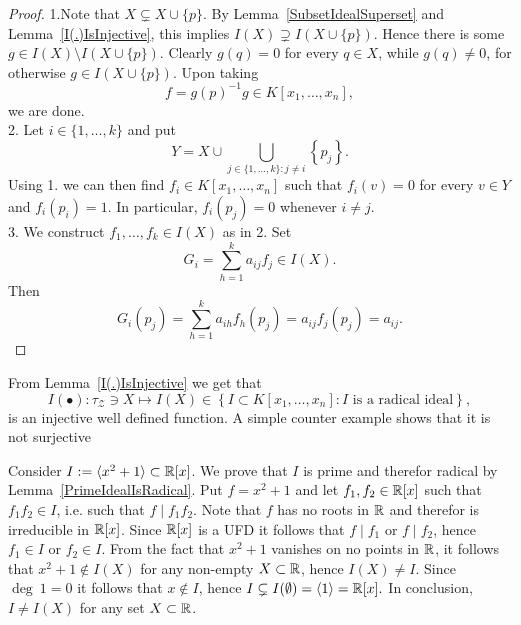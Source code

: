 \begin{proof}
    1.Note that $X\subsetneq X\cup \{p\}$. By Lemma~\ref{SubsetIdealSuperset} and  Lemma~\ref{I(.)IsInjective}, this implies $I(X) \supsetneq I(X\cup\{p\})$. Hence there is some $g\in I(X)\setminus  I(X\cup\{p\})$. Clearly $g(q)=0$ for every $q\in X$, while $g(q)\neq 0$, for otherwise $g \in I(X\cup\{p\})$. Upon taking 
    $$f = g(p)^{-1}g\in K[x_1,\dots,x_n],$$ 
    we are done.\\
    2. Let $i\in \{1,\dots,k\}$ and put 
    $$Y=X\cup \bigcup_{j\in\{1,\dots,k\} : j\neq i} \left\{p_j\right\}.$$
    Using 1. we can then find $f_i\in K[x_1,\dots,x_n]$ such that $f_i(v)=0$ for every $v\in Y$ and $f_i(p_i) = 1$. In particular, $f_i(p_j)=0$ whenever $i\neq j$.\\
    3. We construct $f_1,\dots,f_k\in I(X)$ as in 2. Set 
    $$G_i = \sum_{h=1}^k a_{ij}f_j\in I(X).$$
    Then 
    $$G_i(p_j)=\sum_{h=1}^k a_{ih}f_h(p_j) = a_{ij}f_j(p_j) = a_{ij}.$$
    
\end{proof}
From Lemma~\ref{I(.)IsInjective} we get that
$$I(\bullet):\tau_{\mathcal{Z}}\ni X\mapsto I(X)\in \left\{ I\subset K[x_1,\dots,x_n] : I \text{ is a radical ideal}\right\},$$
is an injective well defined function. A simple counter example shows that it is not surjective

\begin{example}\label{I(.)IsNotSurjective}
    Consider $I:=\langle x^2+1\rangle \subset \mathbb{R}[x]$. We prove that $I$ is prime and therefor radical by Lemma~\ref{PrimeIdealIsRadical}. Put $f = x^2+1$ and let $f_1,f_2\in \mathbb{R}[x]$ such that $f_1f_2\in I$, i.e. such that $f \mid f_1f_2$. Note that $f$ has no roots in $\mathbb{R}$ and therefor is irreducible in $\mathbb{R}[x]$. Since $\mathbb{R}[x]$ is a UFD it follows that $f \mid f_1$ or $f\mid f_2$, hence $f_1\in I$ or $f_2\in I$. From the fact that $x^2+1$ vanishes on no points in $\mathbb{R}$, it follows that $x^2+1\notin I(X)$ for any non-empty $X\subset \mathbb{R}$, hence $I(X) \neq I$. Since $\deg\ 1 =0$ it follows that $x\notin I$, hence $I \subsetneq I(\emptyset) = \langle 1 \rangle = \mathbb{R}[x].$ In conclusion, $I \neq I(X)$ for any set $X\subset \mathbb{R}$. 
\end{example}

